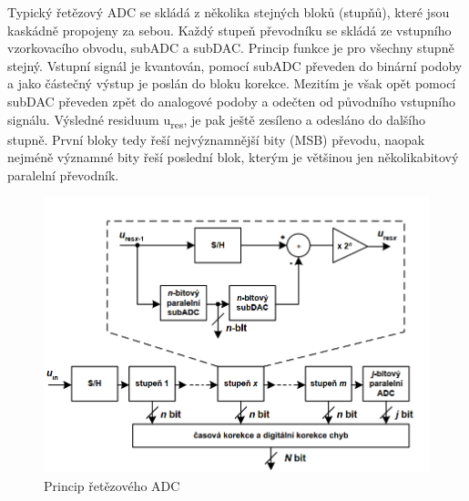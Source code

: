 Typický řetězový ADC se skládá z několika stejných bloků (stupňů), které jsou kaskádně propojeny za sebou. Každý stupeň převodníku se skládá ze vstupního vzorkovacího obvodu, subADC a subDAC. Princip funkce je pro všechny stupně stejný. Vstupní signál je kvantován, pomocí subADC převeden do binární podoby a jako částečný výstup je poslán do bloku korekce. Mezitím je však opět pomocí subDAC převeden zpět do analogové podoby a odečten od původního vstupního signálu. Výsledné residuum u\textsubscript{res}, je pak ještě zesíleno a odesláno do dalšího stupně. První bloky tedy řeší nejvýznamnější bity (MSB) převodu, naopak nejméně významné bity řeší poslední blok, kterým je většinou jen několikabitový paralelní převodník.
\begin{figure}[h]
   \begin{center}
     \includegraphics[scale=0.6]{images/ADret.png}
   \end{center}
   \caption{Princip řetězového ADC}
\end{figure}

